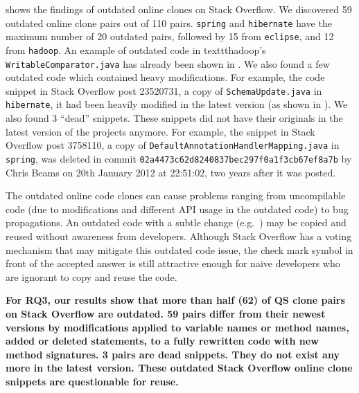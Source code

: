 \documentclass[sigconf,review, anonymous]{acmart}
\begin{document}
 shows the findings of outdated online clones on Stack Overflow. We discovered 59 outdated online clone pairs out of 110 pairs. {\small{\texttt{spring}}} and {\small{\texttt{hibernate}}} have the maximum number of 20 outdated pairs, followed by 15 from {\small{\texttt{eclipse}}}, and 12 from {\small{\texttt{hadoop}}}. An example of outdated code in {\small{texttt{hadoop}}}'s {\small{\texttt{WritableComparator.java}}} has already been shown in . We also found a few outdated code which contained heavy modifications. For example, the code snippet in Stack Overflow post 23520731, a copy of {\small{\texttt{SchemaUpdate.java}}} in {\small{\texttt{hibernate}}}, it had been heavily modified in the latest version (as shown in ). We also found 3 ``dead'' snippets. These snippets did not have their originals in the latest version of the projects anymore. For example, the snippet in Stack Overflow post 3758110, a copy of {\small{\texttt{DefaultAnnotationHandlerMapping.java}}} in {\small{\texttt{spring}}}, was deleted in commit {\small{\texttt{02a4473c62d8240837bec297f0a1f3cb67ef8a7b}}} by Chris Beams on 20th January 2012 at 22:51:02, two years after it was posted. %

The outdated online code clones can cause problems ranging from uncompilable code (due to modifications and different API usage in the outdated code) to bug propagations. An outdated code with a subtle change (e.g.~) may be copied and reused without awareness from developers. Although Stack Overflow has a voting mechanism that may mitigate this outdated code issue, the check mark symbol in front of the accepted answer is still attractive enough for naive developers who are ignorant to copy and reuse the code.

\textbf{For RQ3, our results show that more than half (62) of QS clone pairs on Stack Overflow are outdated. 59 pairs differ from their newest versions by modifications applied to variable names or method names, added or deleted statements, to a fully rewritten code with new method signatures. 3 pairs are dead snippets. They do not exist any more in the latest version. These outdated Stack Overflow online clone snippets are questionable for reuse.} %
\end{document}
